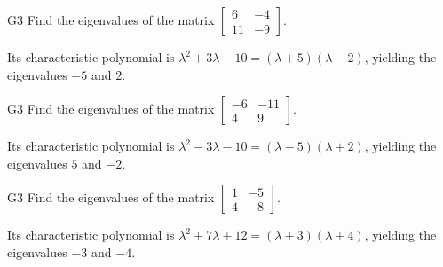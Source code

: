 \begin{problem}{G3}
Find the eigenvalues of the matrix \(\begin{bmatrix} 6 & -4 \\ 11 & -9\end{bmatrix}\).
\end{problem}
\begin{solution}
Its characteristic polynomial is \(\lambda^2+3\lambda-10=(\lambda+5)(\lambda-2)\), yielding the eigenvalues \(-5\) and \(2\).
\end{solution}

\begin{problem}{G3}
Find the eigenvalues of the matrix \(\begin{bmatrix} -6 & -11 \\ 4 & 9\end{bmatrix}\).
\end{problem}
\begin{solution}
Its characteristic polynomial is \(\lambda^2-3\lambda-10=(\lambda-5)(\lambda+2)\), yielding the eigenvalues \(5\) and \(-2\).
\end{solution}

\begin{problem}{G3}
Find the eigenvalues of the matrix \(\begin{bmatrix} 1 & -5 \\ 4 & -8\end{bmatrix}\).
\end{problem}
\begin{solution}
Its characteristic polynomial is \(\lambda^2+7\lambda+12=(\lambda+3)(\lambda+4)\), yielding the eigenvalues \(-3\) and \(-4\).
\end{solution}
